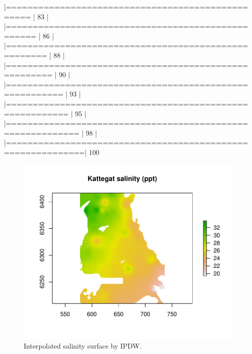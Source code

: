 \documentclass[nojss,shortnames]{jss}
\begin{document}
\begin{Schunk}
\begin{Soutput}
  |==================================================          |  83%
  |                                                                  
  |===================================================         |  86%
  |                                                                  
  |=====================================================       |  88%
  |                                                                  
  |======================================================      |  90%
  |                                                                  
  |========================================================    |  93%
  |                                                                  
  |=========================================================   |  95%
  |                                                                  
  |=========================================================== |  98%
  |                                                                  
  |============================================================| 100%
\end{Soutput}
\end{Schunk}

\begin{figure}[h!]
\begin{center}
\includegraphics{ipdw-figure1}
\end{center}
\vspace{-20pt}
\caption{Interpolated salinity surface by IPDW.}
\label{fig:one}
\end{figure}
\FloatBarrier
\end{document}
